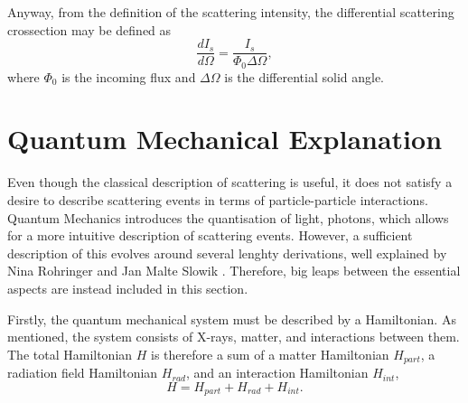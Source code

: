 Anyway, from the definition of the scattering intensity, the differential scattering crossection may be defined as
\begin{equation}\label{eq:scattering_crossection}
    \frac{dI_{s}}{d\Omega} = \frac{I_{s}}{\Phi_{0} \Delta\Omega},
\end{equation}
where $\Phi_{0}$ is the incoming flux and $\Delta\Omega$ is the differential solid angle.



\section{Quantum Mechanical Explanation}\label{sec:quantum_scattering}

Even though the classical description of scattering is useful, it does not satisfy a desire to describe scattering events in terms of particle-particle interactions.
Quantum Mechanics introduces the quantisation of light, photons, which allows for a more intuitive description of scattering events.
However, a sufficient description of this evolves around several lenghty derivations, well explained by Nina Rohringer \cite{rohringer2020introduction} and Jan Malte Slowik \cite{slowik2015quantum}.
Therefore, big leaps between the essential aspects are instead included in this section.

Firstly, the quantum mechanical system must be described by a Hamiltonian. As mentioned, the system consists of X-rays, matter, and interactions between them.
The total Hamiltonian $H$ is therefore a sum of a matter Hamiltonian $H_{part}$, a radiation field Hamiltonian $H_{rad}$, and an interaction Hamiltonian $H_{int}$,
\begin{equation}\label{eq:total_Hamiltonian}
    H = H_{part} + H_{rad} + H_{int}.
\end{equation}

